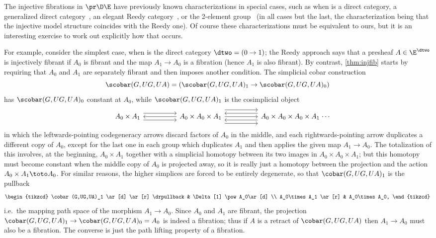 \begin{verbose}
\begin{eg}
  The injective fibrations in $\pr\D\E$ have previously known characterizations in special cases, such as when \D is a direct category, a generalized direct category~\cite{bm:extn-reedy}, an elegant Reedy category~\cite{br:reedy}, or the 2-element group~\cite{bordg:thesis,bordg:injective} (in all cases but the last, the characterization being that the injective model structure coincides with the Reedy one).
  Of course these characterizations must be equivalent to ours, but it is an interesting exercise to work out explicitly how that occurs.

  For example, consider the simplest case, when \D is the direct category $\dtwo = (0\to 1)$; the Reedy approach says that a presheaf $A\in\E^\dtwo$ is injectively fibrant if $A_0$ is fibrant and the map $A_1\to A_0$ is a fibration (hence $A_1$ is also fibrant).
  By contrast, \cref{thm:injfib} starts by requiring that $A_0$ and $A_1$ are separately fibrant and then imposes another condition.
  The simplicial cobar construction
  \[\scobar(G,U G,U A) = (\scobar(G,U G,U A)_1 \to \scobar(G,U G,U A)_0)\]
  has $\scobar(G,U G,U A)_0$ constant at $A_0$, while $\scobar(G,U G,U A)_1$ is the cosimplicial object
  \[
    \begin{tikzcd}[column sep=huge]
      A_0 \times A_1 \ar[r,shift left=2] \ar[r,shift right=2] \ar[r,<-] &
      A_0 \times A_0 \times A_1 \ar[r,shift left=4] \ar[r,shift right=4] \ar[r] \ar[r,shift left=2,<-] \ar[r,shift right=2,<-] &
      A_0 \times A_0 \times A_0 \times A_1 \mathrlap{\; \cdots}
    \end{tikzcd}
  \]
  in which the leftwards-pointing codegeneracy arrows discard factors of $A_0$ in the middle, and each rightwards-pointing arrow duplicates a different copy of $A_0$, except for the last one in each group which duplicates $A_1$ and then applies the given map $A_1\to A_0$.
  The totalization of this involves, at the beginning, $A_0\times A_1$ together with a simplicial homotopy between its two images in $A_0\times A_0\times A_1$; but this homotopy must become constant when the middle copy of $A_0$ is projected away, so it is really just a homotopy between the projection and the action $A_0\times A_1\toto A_0$.
  For similar reasons, the higher simplices are forced to be entirely degenerate, so that $\cobar(G,UG,UA)_1$ is the pullback
  \[
    \begin{tikzcd}
      \cobar(G,UG,UA)_1 \ar[d] \ar[r] \drpullback & \Delta[1] \pow A_0\ar[d] \\
      A_0\times A_1 \ar[r] & A_0\times A_0,
    \end{tikzcd}
  \]
  i.e.\ the mapping path space of the morphism $A_1\to A_0$.
  Since $A_0$ and $A_1$ are fibrant, the projection $\cobar(G,UG,UA)_1 \to \cobar(G,UG,UA)_0 = A_0$ is indeed a fibration; thus if $A$ is a retract of $\cobar(G,UG,UA)$ then $A_1\to A_0$ must also be a fibration.
  The converse is just the path lifting property of a fibration.
\end{eg}
\end{verbose}

